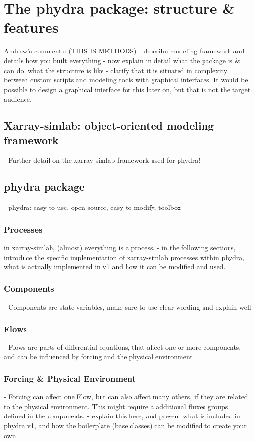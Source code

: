 \documentclass[journal abbreviation, manuscript]{copernicus}
\begin{document}
\section{The phydra package: structure \& features}

Andrew's comments: (THIS IS METHODS)
- describe modeling framework and details how you built everything
- now explain in detail what the package is \& can do, what the structure is like
- clarify that it is situated in complexity between custom scripts and modeling tools with graphical interfaces. It would be possible to design a graphical interface for this later on, but that is not the target audience.


\subsection{Xarray-simlab: object-oriented modeling framework}
- Further detail on the xarray-simlab framework used for phydra!

\subsection{phydra package}
- phydra: easy to use, open source, easy to modify, toolbox

\subsubsection{Processes}
in xarray-simlab, (almost) everything is a process.
- in the following sections, introduce the specific implementation of xarray-simlab processes within phydra, what is actually implemented in v1 and how it can be modified and used.

\subsubsection{Components}
- Components are state variables, make sure to use clear wording and explain well

\subsubsection{Flows}
- Flows are parts of differential equations, that affect one or more components, and can be influenced by forcing and the physical environment

\subsubsection{Forcing & Physical Environment}
- Forcing can affect one Flow, but can also affect many others, if they are related to the physical environment. This might require a additional fluxes groups defined in the components. 
- explain this here, and present what is included in phydra v1, and how the boilerplate (base classes) can be modified to create your own.
\end{document}
